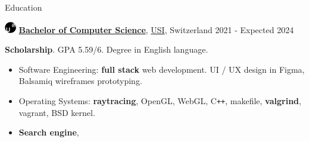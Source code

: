 \documentclass{cv} %
\def\titlelistvspace{-0.15cm}
\begin{document}
\begin{rSection}{Education}

    \includegraphics[width=0.5cm, trim={0cm 5cm 0cm 0cm}]{usi-icon.png}
    {\bf \underline{Bachelor of Computer Science}},
    \href{https://www.usi.ch/en}{USI}, Switzerland
    \hfill {2021 - Expected 2024}

    \textbf{Scholarship}. GPA 5.59/6. Degree in English language.

    \vspace{\titlelistvspace}\begin{itemize}
        \itemsep -3pt {}
        \item Software Engineering: \textbf{full stack} web development.
              UI / UX design in Figma, Balsamiq wireframes prototyping.
        \item Operating Systems:
              \textbf{raytracing},
              OpenGL,
              WebGL,
              C\texttt{++},
              makefile,
              \textbf{valgrind},
              vagrant,
              BSD kernel.
        \item \textbf{Search engine},

\end{itemize}
\end{rSection}
\end{document}
